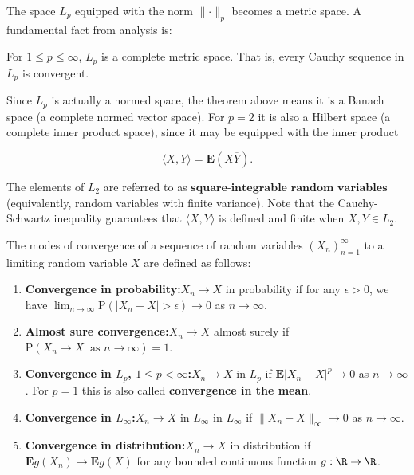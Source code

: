 \noindent The space $L_p$ equipped with the norm
$\lVert \cdot \rVert_p$ becomes a metric space. A
fundamental fact from analysis is:

\begin{thm}
For $1\le p\le \infty$, $L_p$ is a complete metric
space. That is, every Cauchy sequence in $L_p$ is
convergent.
\end{thm}

\noindent Since $L_p$ is actually a normed space, the theorem
above means it is a Banach space (a complete normed
vector space). For $p=2$ it is also a Hilbert space
(a complete inner product space), since it may be
equipped with the inner product

\[
\langle X,Y\rangle = \mathbf{E}(X\overline{Y}).
\]

\noindent The elements of $L_2$ are referred to as
$\textbf{square-integrable random variables}$
(equivalently, random variables with finite variance).
Note that the Cauchy-Schwartz inequality guarantees
that $\langle X,Y\rangle$ is defined and finite when
$X,Y\in L_2$.

\begin{defn}
The modes of convergence of a sequence of random
variables $(X_n)_{n=1}^\infty$ to a limiting random
variable $X$ are defined as follows:

\begin{enumerate}[label=\arabic*.]
\item \textbf{Convergence in probability:}$X_n \to X$ in
probability if for any $\epsilon>0$, we have
$\lim_{n\to\infty} \mathrm{P}(|X_n-X|>\epsilon)\to 0$
as $n\to\infty$.

\item \textbf{Almost sure convergence:}$X_n\to X$ almost surely
if
$\mathrm{P}(X_n\to X\ \textrm{ as }n\to\infty) = 1$.

\item \textbf{Convergence in $L_p$, $1\le p<\infty$:}$X_n\to X$
in $L_p$ if $\mathbf{E}|X_n-X|^p \to 0$ as
$n\to\infty$. For $p=1$ this is also called
\textbf{convergence in the mean}.

\item \textbf{Convergence in $L_\infty$:}$X_n\to X$ in $L_\infty$
in $L_\infty$ if $\lVert X_n-X\rVert_\infty\to 0$ as
$n\to\infty$.

\item \textbf{Convergence in distribution:}$X_n\to X$ in
distribution if $\mathbf{E} g(X_n)\to \mathbf{E} g(X)$
for any bounded continuous function $g:\R\to\R$.
\end{enumerate}

\end{defn}

